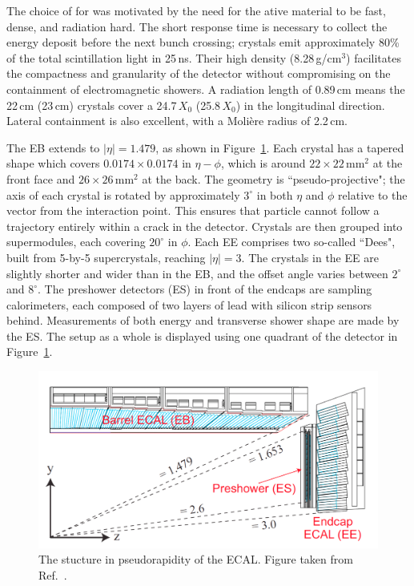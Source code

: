 The choice of \pbw for was motivated by the need for the ative material to be fast, dense, and radiation hard.
The short response time is necessary to collect the energy deposit before the next bunch crossing; 
\pbw crystals emit approximately 80\% of the total scintillation light in 25\,ns.
Their high density (8.28\,g/$\textrm{cm}^3$) facilitates the compactness and granularity of the detector without compromising on the containment of electromagnetic showers.
A radiation length of 0.89\,cm means the 22\,cm (23\,cm) crystals cover a 24.7\,$X_0$ (25.8\,$X_0$) in the longitudinal direction. %
Lateral containment is also excellent, with a Moli\`ere radius of 2.2\,cm. %

The EB extends to $|\eta|=1.479$, as shown in Figure~\ref{fig:detector_ECALquadrant}.
Each crystal has a tapered shape which covers $0.0174\times0.0174$ in $\eta-\phi$, 
which is around $22\times22\,\textrm{mm}^2$ at the front face and $26\times26\,\textrm{mm}^2$ at the back.
The geometry is ``pseudo-projective"; the axis of each crystal is rotated by approximately $3^{\circ}$ in both $\eta$ and $\phi$ relative to the vector from the interaction point.
This ensures that particle cannot follow a trajectory entirely within a crack in the detector.
Crystals are then grouped into supermodules, each covering $20^{\circ}$ in $\phi$.
Each EE comprises two so-called ``Dees", built from 5-by-5 supercrystals, reaching $|\eta|=3$.
The crystals in the EE are slightly shorter and wider than in the EB, 
and the offset angle varies between $2^{\circ}$ and $8^{\circ}$.
The preshower detectors (ES) in front of the endcaps are sampling calorimeters, 
each composed of two layers of lead with silicon strip sensors behind. %
Measurements of both energy and transverse shower shape are made by the ES.
The setup as a whole is displayed using one quadrant of the detector in Figure~\ref{fig:detector_ECALquadrant}.

\begin{figure}[h!]
  \centering
  \includegraphics[width=\textwidth]{Figures/Detector/ECALquadrant.png}
  \caption[The stucture in pseudorapdity of the CMS ECAL.]
  {The stucture in pseudorapidity of the ECAL.
  Figure taken from Ref.~\cite{ECALperformance}.}
  \label{fig:detector_ECALquadrant}
\end{figure}

